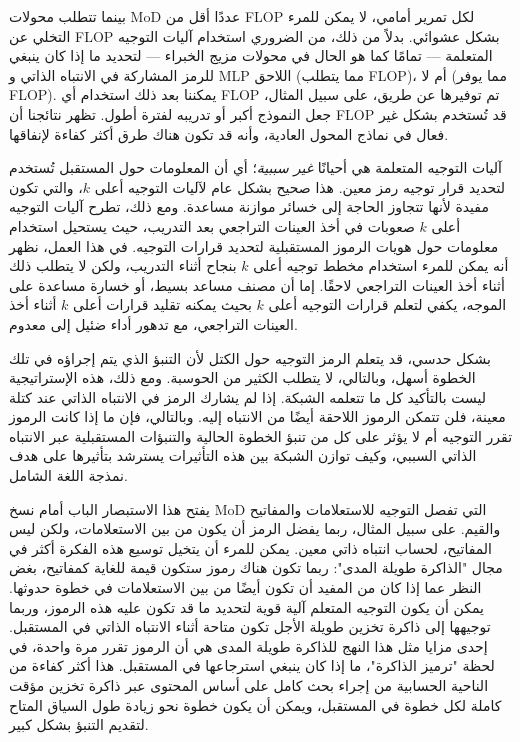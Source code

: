 \documentclass[11pt, a4paper, onecolumn, logo, copyright]{googledeepmind}
\begin{document}
بينما تتطلب محولات MoD عددًا أقل من FLOP لكل تمرير أمامي، لا يمكن للمرء التخلي عن FLOP بشكل عشوائي. بدلاً من ذلك، من الضروري استخدام آليات التوجيه المتعلمة --- تمامًا كما هو الحال في محولات مزيج الخبراء --- لتحديد ما إذا كان ينبغي للرمز المشاركة في الانتباه الذاتي و MLP اللاحق (مما يتطلب FLOP)، أم لا (مما يوفر FLOP). يمكننا بعد ذلك استخدام أي FLOP تم توفيرها عن طريق، على سبيل المثال، جعل النموذج أكبر أو تدريبه لفترة أطول. تظهر نتائجنا أن FLOP قد تُستخدم بشكل غير فعال في نماذج المحول العادية، وأنه قد تكون هناك طرق أكثر كفاءة لإنفاقها.

آليات التوجيه المتعلمة هي أحيانًا \textit{غير سببية}؛ أي أن المعلومات حول المستقبل تُستخدم لتحديد قرار توجيه رمز معين. هذا صحيح بشكل عام لآليات التوجيه أعلى $k$، والتي تكون مفيدة لأنها تتجاوز الحاجة إلى خسائر موازنة مساعدة. ومع ذلك، تطرح آليات التوجيه أعلى $k$ صعوبات في أخذ العينات التراجعي بعد التدريب، حيث يستحيل استخدام معلومات حول هويات الرموز المستقبلية لتحديد قرارات التوجيه. في هذا العمل، نظهر أنه يمكن للمرء استخدام مخطط توجيه أعلى $k$ بنجاح أثناء التدريب، ولكن لا يتطلب ذلك أثناء أخذ العينات التراجعي لاحقًا. إما أن مصنف مساعد بسيط، أو خسارة مساعدة على الموجه، يكفي لتعلم قرارات التوجيه أعلى $k$ بحيث يمكنه تقليد قرارات أعلى $k$ أثناء أخذ العينات التراجعي، مع تدهور أداء ضئيل إلى معدوم.

بشكل حدسي، قد يتعلم الرمز التوجيه حول الكتل لأن التنبؤ الذي يتم إجراؤه في تلك الخطوة أسهل، وبالتالي، لا يتطلب الكثير من الحوسبة. ومع ذلك، هذه الإستراتيجية ليست بالتأكيد كل ما تتعلمه الشبكة. إذا لم يشارك الرمز في الانتباه الذاتي عند كتلة معينة، فلن تتمكن الرموز اللاحقة أيضًا من الانتباه إليه. وبالتالي، فإن ما إذا كانت الرموز تقرر التوجيه أم لا يؤثر على كل من تنبؤ الخطوة الحالية والتنبؤات المستقبلية عبر الانتباه الذاتي السببي، وكيف توازن الشبكة بين هذه التأثيرات يسترشد بتأثيرها على هدف نمذجة اللغة الشامل.

يفتح هذا الاستبصار الباب أمام نسخ MoD التي تفصل التوجيه للاستعلامات والمفاتيح والقيم. على سبيل المثال، ربما يفضل الرمز أن يكون من بين الاستعلامات، ولكن ليس المفاتيح، لحساب انتباه ذاتي معين. يمكن للمرء أن يتخيل توسيع هذه الفكرة أكثر في مجال "الذاكرة طويلة المدى": ربما تكون هناك رموز ستكون قيمة للغاية كمفاتيح، بغض النظر عما إذا كان من المفيد أن تكون أيضًا من بين الاستعلامات في خطوة حدوثها. يمكن أن يكون التوجيه المتعلم آلية قوية لتحديد ما قد تكون عليه هذه الرموز، وربما توجيهها إلى ذاكرة تخزين طويلة الأجل تكون متاحة أثناء الانتباه الذاتي في المستقبل. إحدى مزايا مثل هذا النهج للذاكرة طويلة المدى هي أن الرموز تقرر مرة واحدة، في لحظة "ترميز الذاكرة"، ما إذا كان ينبغي استرجاعها في المستقبل. هذا أكثر كفاءة من الناحية الحسابية من إجراء بحث كامل على أساس المحتوى عبر ذاكرة تخزين مؤقت كاملة لكل خطوة في المستقبل، ويمكن أن يكون خطوة نحو زيادة طول السياق المتاح لتقديم التنبؤ بشكل كبير.
\end{document}
